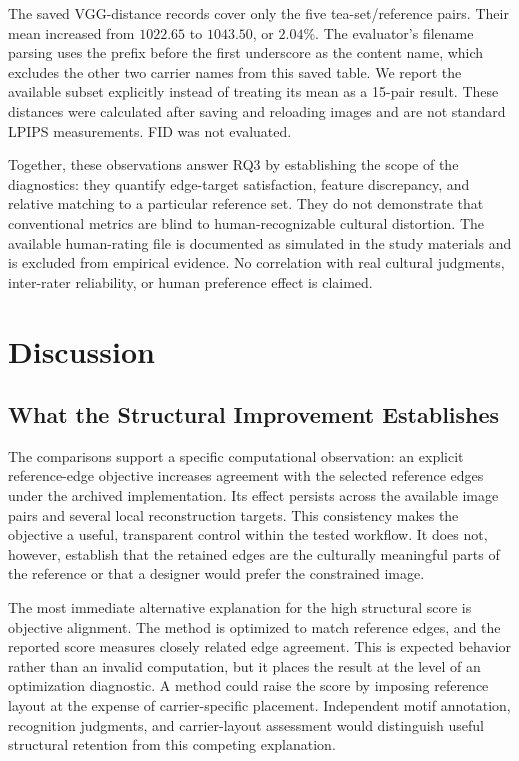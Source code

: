 \documentclass[manuscript,acmlarge,screen,review]{acmart}
\begin{document}
The saved VGG-distance records cover only the five tea-set/reference pairs. Their mean increased from $1022.65$ to $1043.50$, or $2.04\%$. The evaluator's filename parsing uses the prefix before the first underscore as the content name, which excludes the other two carrier names from this saved table. We report the available subset explicitly instead of treating its mean as a 15-pair result. These distances were calculated after saving and reloading images and are not standard LPIPS measurements. FID was not evaluated.

Together, these observations answer RQ3 by establishing the scope of the diagnostics: they quantify edge-target satisfaction, feature discrepancy, and relative matching to a particular reference set. They do not demonstrate that conventional metrics are blind to human-recognizable cultural distortion. The available human-rating file is documented as simulated in the study materials and is excluded from empirical evidence. No correlation with real cultural judgments, inter-rater reliability, or human preference effect is claimed.

\section{Discussion}
\label{sec:discussion}

\subsection{What the Structural Improvement Establishes}
The comparisons support a specific computational observation: an explicit reference-edge objective increases agreement with the selected reference edges under the archived implementation. Its effect persists across the available image pairs and several local reconstruction targets. This consistency makes the objective a useful, transparent control within the tested workflow. It does not, however, establish that the retained edges are the culturally meaningful parts of the reference or that a designer would prefer the constrained image.

The most immediate alternative explanation for the high structural score is objective alignment. The method is optimized to match reference edges, and the reported score measures closely related edge agreement. This is expected behavior rather than an invalid computation, but it places the result at the level of an optimization diagnostic. A method could raise the score by imposing reference layout at the expense of carrier-specific placement. Independent motif annotation, recognition judgments, and carrier-layout assessment would distinguish useful structural retention from this competing explanation.
\end{document}
